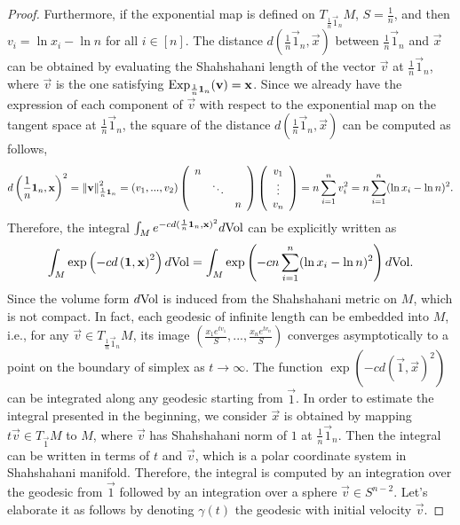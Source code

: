 \begin{proof}
Furthermore, if the exponential map is defined on $T_{\frac{1}{n}\vec{1}_n}M$, $S=\frac{1}{n}$, and then $v_i=\ln x_i-\ln n$ for all $i\in[n]$. The distance $d(\frac{1}{n}\vec{1}_n,\vec{x})$ between $\frac{1}{n}\vec{1}_n$ and $\vec{x}$ can be obtained by evaluating the Shahshahani length of the vector $\vec{v}$ at $\frac{1}{n}\vec{1}_n$, where $\vec{v}$ is the one satisfying $\mathrm{Exp}_{\frac{1}{n}\mathbf{1}_n}(\mathbf{v})=\mathbf{x}$. Since we already have the expression of each component of $\vec{v}$ with respect to the exponential map on the tangent space at $\frac{1}{n}\vec{1}_n$, the square of the distance $d(\frac{1}{n}\vec{1}_n,\vec{x})$ can be computed as follows,
\begin{equation}
d\left(\frac{1}{n}\mathbf{1}_n,\mathbf{x}\right)^2=\left\Vert \mathbf{v} \right\Vert_{\frac{1}{n}\mathbf{1}_n}^2=(v_1,...,v_2)\left(
\begin{array}{ccc}
n&&
\\
&\ddots&
\\
&&n
\end{array}\right)
\left(
\begin{array}{c}
v_1
\\
\vdots
\\
v_n
\end{array}
\right)=n\sum_{i=1}^nv_i^2=n\sum_{i=1}^n(\ln x_i-\ln n)^2.
\end{equation}
Therefore, the integral $\int_Me^{-cd(\frac{1}{n}\mathbf{1}_n,\mathbf{x})^2}d\mathrm{Vol}$ can be explicitly written as
\[
\int_M\exp\left(-cd\left(\mathbf{1},\mathbf{x}\right)^2\right)d\mathrm{Vol}=\int_M\exp\left(-cn\sum_{i=1}^n(\ln x_i-\ln n)^2\right)d\mathrm{Vol}.
\]
Since the volume form $d\mathrm{Vol}$ is induced from the Shahshahani metric on $M$, which is not compact. In fact, each geodesic of infinite length can be embedded into $M$, i.e., for any $\vec{v}\in T_{\frac{1}{n}\vec{1}_n}M$, its image $\left(\frac{x_1e^{tv_1}}{S},...,\frac{x_ne^{tv_n}}{S}\right)$ converges asymptotically to a point on the boundary of simplex as $t\rightarrow \infty$. The function $\exp\left(-cd\left(\vec{1},\vec{x}\right)^2\right)$ can be integrated along any geodesic starting from $\vec{1}$. In order to estimate the integral presented in the beginning, we consider $\vec{x}$ is obtained by mapping $t\vec{v}\in T_{\vec{1}}M$ to $M$, where $\vec{v}$ has Shahshahani norm of $1$ at $\frac{1}{n}\vec{1}_n$. Then the integral can be written in terms of $t$ and $\vec{v}$, which is a polar coordinate system in Shahshahani manifold. Therefore, the integral is computed by an integration over the geodesic from $\vec{1}$ followed by an integration over a sphere $\vec{v}\in S^{n-2}$. Let's elaborate it as follows by denoting $\gamma(t)$ the geodesic with initial velocity $\vec{v}$.


\end{proof}
